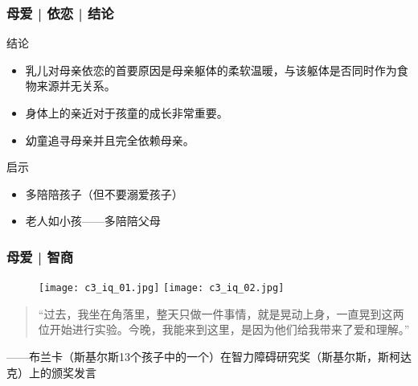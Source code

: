 \begin{frame}
  \frametitle{母爱 | 依恋 | 结论}
  \begin{block}{结论}
    \begin{itemize}
      \item 乳儿对母亲依恋的首要原因是母亲躯体的柔软温暖，与该躯体是否同时作为食物来源并无关系。
      \item 身体上的亲近对于孩童的成长非常重要。
      \item 幼童追寻母亲并且完全依赖母亲。
    \end{itemize}
  \end{block}
  \pause
  \begin{block}{启示}
    \begin{itemize}
      \item 多陪陪孩子（但不要溺爱孩子）
      \item 老人如小孩——多陪陪父母
    \end{itemize}
  \end{block}
\end{frame}

\begin{frame}
  \frametitle{母爱 | 智商}
  \begin{figure}
    \centering
    \texttt{[image: c3\_iq\_01.jpg]}
    \texttt{[image: c3\_iq\_02.jpg]}
  \end{figure}
  \pause
  \begin{quote}
    “过去，我坐在角落里，整天只做一件事情，就是晃动上身，一直晃到这两位开始进行实验。今晚，我能来到这里，是因为他们给我带来了爱和理解。”
  \end{quote}
   \qquad ——布兰卡（斯基尔斯13个孩子中的一个）在智力障碍研究奖（斯基尔斯，斯柯达克）上的颁奖发言
\end{frame}

